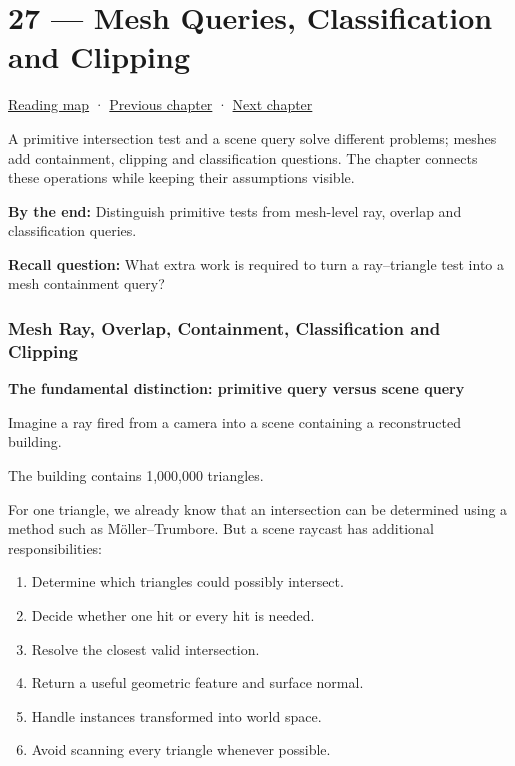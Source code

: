 \hypertarget{04-visual-computing-ii-ch027}{}
\chapter{27 --- Mesh Queries, Classification and Clipping}\label{04-visual-computing-ii-ch027-mesh-queries-classification-and-clipping}

\hyperref[volume-reading-map]{Reading map} · \hyperref[04-visual-computing-ii-ch026-contact-features-and-manifolds]{Previous chapter} · \hyperref[04-visual-computing-ii-ch028-visibility-queries-and-ray-intersections]{Next chapter}

A primitive intersection test and a scene query solve different problems; meshes add containment, clipping and classification questions. The chapter connects these operations while keeping their assumptions visible.

\textbf{By the end:} Distinguish primitive tests from mesh-level ray, overlap and classification queries.

\textbf{Recall question:} What extra work is required to turn a ray--triangle test into a mesh containment query?

\subsection{Mesh Ray, Overlap, Containment, Classification and Clipping}\label{04-visual-computing-ii-ch027-mesh-ray-overlap-containment-classification-and-clipping}

\textbf{The fundamental distinction: primitive query versus scene query}

Imagine a ray fired from a camera into a scene containing a reconstructed building.

The building contains 1,000,000 triangles.

For one triangle, we already know that an intersection can be determined using a method such as Möller--Trumbore. But a scene raycast has additional responsibilities:

\begin{enumerate}
\def\labelenumi{\arabic{enumi}.}
\tightlist
\item
  Determine which triangles could possibly intersect.
\item
  Decide whether one hit or every hit is needed.
\item
  Resolve the closest valid intersection.
\item
  Return a useful geometric feature and surface normal.
\item
  Handle instances transformed into world space.
\item
  Avoid scanning every triangle whenever possible.
\end{enumerate}

